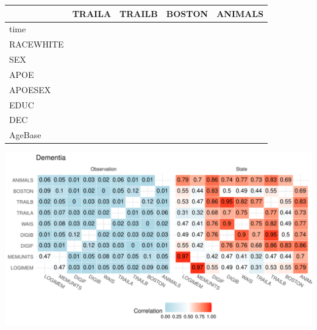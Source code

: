\documentclass[
]{article}
\begin{document}
\begin{longtable}[t]{l|l|l|l|l}
\hline
  & TRAILA & TRAILB & BOSTON & ANIMALS\\
\hline
time & \cellcolor{red}{-0.26 (-0.48, -0.04)} & \cellcolor{red}{-0.46 (-0.67, -0.27)} & \cellcolor{white}{-0.06 (-0.25, 0.10)} & \cellcolor{red}{-0.20 (-0.38, -0.04)}\\
\hline
RACEWHITE & \cellcolor{white}{-0.11 (-0.28, 0.07)} & \cellcolor{red}{-0.06 (-0.21, 0.11)} & \cellcolor{white}{-0.12 (-0.26, 0.03)} & \cellcolor{red}{-0.30 (-0.43, -0.16)}\\
\hline
SEX & \cellcolor{white}{0.12 (-0.05, 0.29)} & \cellcolor{white}{0.07 (-0.09, 0.22)} & \cellcolor{red}{-0.15 (-0.27, -0.03)} & \cellcolor{white}{-0.08 (-0.21, 0.04)}\\
\hline
APOE & \cellcolor{white}{0.05 (-0.13, 0.24)} & \cellcolor{white}{-0.05 (-0.22, 0.12)} & \cellcolor{white}{-0.06 (-0.23, 0.11)} & \cellcolor{white}{-0.11 (-0.27, 0.04)}\\
\hline
APOESEX & \cellcolor{white}{-0.25 (-0.47, -0.02)} & \cellcolor{white}{-0.19 (-0.41, 0.02)} & \cellcolor{white}{0.03 (-0.15, 0.23)} & \cellcolor{white}{-0.04 (-0.23, 0.13)}\\
\hline
EDUC & \cellcolor{white}{-0.01 (-0.01, 0.00)} & \cellcolor{red}{-0.00 (-0.01, 0.00)} & \cellcolor{white}{0.00 (-0.01, 0.01)} & \cellcolor{white}{0.00 (-0.00, 0.01)}\\
\hline
DEC & \cellcolor{red}{-0.44 (-0.59, -0.28)} & \cellcolor{red}{-0.26 (-0.40, -0.12)} & \cellcolor{red}{-0.33 (-0.44, -0.21)} & \cellcolor{red}{-0.13 (-0.25, -0.01)}\\
\hline
AgeBase & \cellcolor{red}{-0.02 (-0.02, -0.01)} & \cellcolor{red}{-0.02 (-0.02, -0.01)} & \cellcolor{red}{-0.01 (-0.02, -0.01)} & \cellcolor{red}{-0.01 (-0.02, -0.01)}\\
\hline
\end{longtable}
\endgroup{}

\includegraphics{DataAnalysis_files/figure-latex/unnamed-chunk-3-1.pdf}
\end{document}
